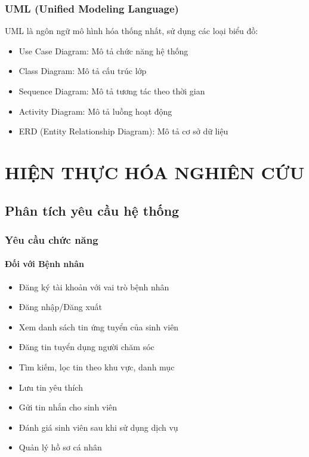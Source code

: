 \documentclass[a4paper,12pt]{report}
\begin{document}
\subsection{UML (Unified Modeling Language)}
UML là ngôn ngữ mô hình hóa thống nhất, sử dụng các loại biểu đồ:
\begin{itemize}
    \item Use Case Diagram: Mô tả chức năng hệ thống
    \item Class Diagram: Mô tả cấu trúc lớp
    \item Sequence Diagram: Mô tả tương tác theo thời gian
    \item Activity Diagram: Mô tả luồng hoạt động
    \item ERD (Entity Relationship Diagram): Mô tả cơ sở dữ liệu
\end{itemize}


\chapter{HIỆN THỰC HÓA NGHIÊN CỨU}

\section{Phân tích yêu cầu hệ thống}

\subsection{Yêu cầu chức năng}

\subsubsection{Đối với Bệnh nhân}
\begin{itemize}
    \item Đăng ký tài khoản với vai trò bệnh nhân
    \item Đăng nhập/Đăng xuất
    \item Xem danh sách tin ứng tuyển của sinh viên
    \item Đăng tin tuyển dụng người chăm sóc
    \item Tìm kiếm, lọc tin theo khu vực, danh mục
    \item Lưu tin yêu thích
    \item Gửi tin nhắn cho sinh viên
    \item Đánh giá sinh viên sau khi sử dụng dịch vụ
    \item Quản lý hồ sơ cá nhân
\end{itemize}
\end{document}
